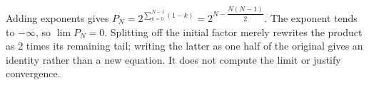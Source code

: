 Adding exponents gives $P_N=2^{\sum_{k=0}^{N-1}(1-k)}=2^{N-\dfrac{N(N-1)}{2}}$. The exponent tends to $-\infty$, so $\boxed{\lim P_N=0}$. Splitting off the initial factor merely rewrites the product as 2 times its remaining tail; writing the latter as one half of the original gives an identity rather than a new equation. It does not compute the limit or justify convergence.
